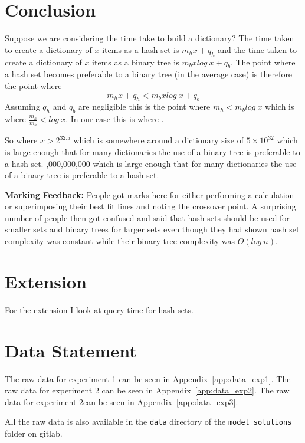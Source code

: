 \documentclass[a4]{article}
\newif\ifc
\newif\ifjava
\newif\ifpython
\begin{document}
\section{Conclusion}
\label{sec:conclusion}
Suppose we are considering the time take to build a dictionary?  The time taken to create a dictionary of $x$ items as a hash set is $m_h x + q_h$ and the time taken to create a dictionary of $x$ items as a binary tree is $m_b x log~x + q_b$.  The point where a hash set becomes preferable to a binary tree (in the average case) is therefore the point where 
$$m_h x + q_h < m_b x log~x + q_b$$
Assuming $q_h$ and $q_b$ are negligible this is the point where $m_h < m_b log~x$ which is where $\frac{m_h}{m_b} < log~x$.  In our case this is where \ifc $log~x > \frac{0.0017}{0.000116} \approx 15$ \fi 
\ifjava $log~x > \frac{0.01}{0.000092} \approx 108.6$ \fi. 
\ifpython  $log~x > \frac{0.013}{0.0004} \approx 32.5$  \fi 
So where \ifc $x > 2^{15}$ \fi
 \ifjava $x > 2^{108.6}$ \fi \ifpython $x > 2^{32.5}$ \fi which is somewhere around a dictionary size of \ifc 32k. \fi   \ifjava $5 \times 10^{32}$ which is large enough that for many dictionaries the use of a binary tree is preferable to a hash set. \fi  \ifc This is borne out by looking at Figure~\ref{fig:exp2} where we see that the time per insert into a binary tree exceeds 0.0017 (the time per insert in the hash set) at around this point. \fi     {},000,000,000 which is large enough that for many dictionaries the use of a binary tree is preferable to a hash set. \fi             

{\bf Marking Feedback:} People got marks here for either performing a calculation or superimposing their best fit lines and noting the crossover point.  A surprising number of people then got confused and said that hash sets should be used for smaller sets and binary trees for larger sets even though they had shown hash set complexity was constant while their binary tree complexity was $O(log~n)$.

\section{Extension}
For the extension I look at query time for hash sets.
 
 
 \section{Data Statement}

The raw data for experiment 1 can be seen in Appendix~\ref{app:data_exp1}.
The raw data for experiment 2 can be seen in Appendix~\ref{app:data_exp2}.
The raw data for experiment 2can be seen in Appendix~\ref{app:data_exp3}.

All the raw data is also available in the \texttt{data} directory of the \texttt{model\_solutions} folder on gitlab.

\newpage 
\appendix



\end{document}
